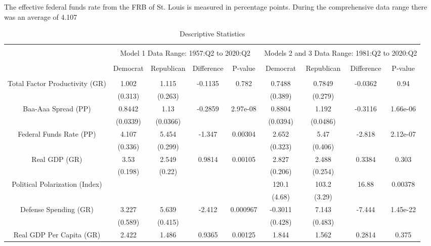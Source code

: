 \documentclass[a4paper, 12pt]{article}
\begin{document}
The effective federal funds rate from the FRB of St. Louis is measured in percentage points. During the comprehensive data range there was an average of 4.107 \par 

\begin{landscape}
\begin{table}[!htbp] \centering 
  \caption{Descriptive Statistics} 
  \label{} 
\begin{tabular}{@{\extracolsep{5pt}} ccccccccc} 
\\[-1.8ex]\hline 
\hline \\[-1.8ex] 
& \multicolumn{4}{c}{Model 1 Data Range: 1957:Q2 to 2020:Q2} & \multicolumn{4}{c}{Models 2 and 3 Data Range: 1981:Q2 to 2020:Q2}\\
\hline \\[-1.8ex] 
 & Democrat & Republican & Difference & P-value & Democrat  & Republican  & Difference  & P-value  \\ 
\hline \\[-1.8ex] 
Total Factor Productivity (GR) & 1.002 & 1.115 & -0.1135 & 0.782 & 0.7488 & 0.7849 & -0.0362 & 0.94 \\ 
 & (0.313) & (0.263) &  &  & (0.389) & (0.279) &  &  \\ 
Baa-Aaa Spread (PP) & 0.8442 & 1.13 & -0.2859 & 2.97e-08 & 0.8804 & 1.192 & -0.3116 & 1.66e-06 \\ 
 & (0.0339) & (0.0366) &  &  & (0.0394) & (0.0486) &  &  \\ 
 Federal Funds Rate (PP) & 4.107 & 5.454 & -1.347 & 0.00304 & 2.652 & 5.47 & -2.818 & 2.12e-07 \\ 
 & (0.336) & (0.299) &  &  & (0.323) & (0.406) &  &  \\ 
Real GDP (GR) & 3.53 & 2.549 & 0.9814 & 0.00105 & 2.827 & 2.488 & 0.3384 & 0.303 \\ 
 & (0.198) & (0.22) &  &  & (0.206) & (0.254) &  &  \\ 
Political Polarization (Index) &  &  &  &  & 120.1 & 103.2 & 16.88 & 0.00378 \\ 
 &  &  &  &  & (4.68) & (3.29) &  &  \\
Defense Spending (GR) & 3.227 & 5.639 & -2.412 & 0.000967 & -0.3011 & 7.143 & -7.444 & 1.45e-22 \\ 
 & (0.589) & (0.415) &  &  & (0.428) & (0.483) &  &  \\ 
 Real GDP Per Capita (GR) & 2.422 & 1.486 & 0.9365 & 0.00125 & 1.844 & 1.562 & 0.2814 & 0.375 \\ 

\end{tabular}
\end{table}
\end{landscape}
\end{document}
